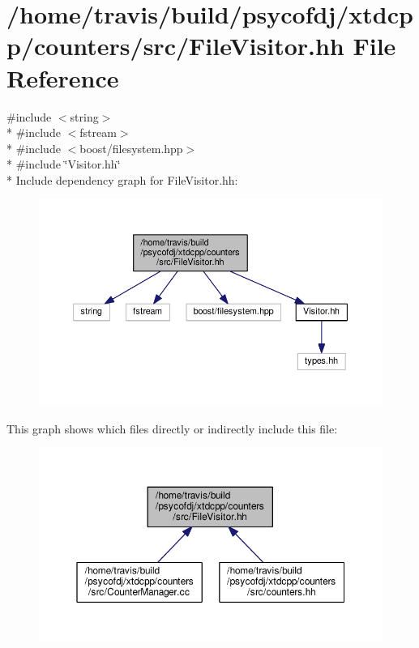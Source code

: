 \hypertarget{FileVisitor_8hh}{\section{/home/travis/build/psycofdj/xtdcpp/counters/src/\-File\-Visitor.hh File Reference}
\label{FileVisitor_8hh}
}
{\ttfamily \#include $<$string$>$}\\*
{\ttfamily \#include $<$fstream$>$}\\*
{\ttfamily \#include $<$boost/filesystem.\-hpp$>$}\\*
{\ttfamily \#include \char`\"{}Visitor.\-hh\char`\"{}}\\*
Include dependency graph for File\-Visitor.\-hh\-:
\nopagebreak
\begin{figure}[H]
\begin{center}
\leavevmode
\includegraphics[width=350pt]{FileVisitor_8hh__incl}
\end{center}
\end{figure}
This graph shows which files directly or indirectly include this file\-:
\nopagebreak
\begin{figure}[H]
\begin{center}
\leavevmode
\includegraphics[width=350pt]{FileVisitor_8hh__dep__incl}
\end{center}
\end{figure}
